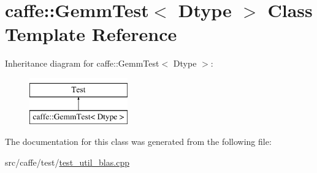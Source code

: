 \hypertarget{classcaffe_1_1_gemm_test}{\section{caffe\+:\+:Gemm\+Test$<$ Dtype $>$ Class Template Reference}
\label{classcaffe_1_1_gemm_test}
}
Inheritance diagram for caffe\+:\+:Gemm\+Test$<$ Dtype $>$\+:\begin{figure}[H]
\begin{center}
\leavevmode
\includegraphics[height=2.000000cm]{classcaffe_1_1_gemm_test}
\end{center}
\end{figure}


The documentation for this class was generated from the following file\+:\begin{DoxyCompactItemize}
\item 
src/caffe/test/\hyperlink{test__util__blas_8cpp}{test\+\_\+util\+\_\+blas.\+cpp}\end{DoxyCompactItemize}
